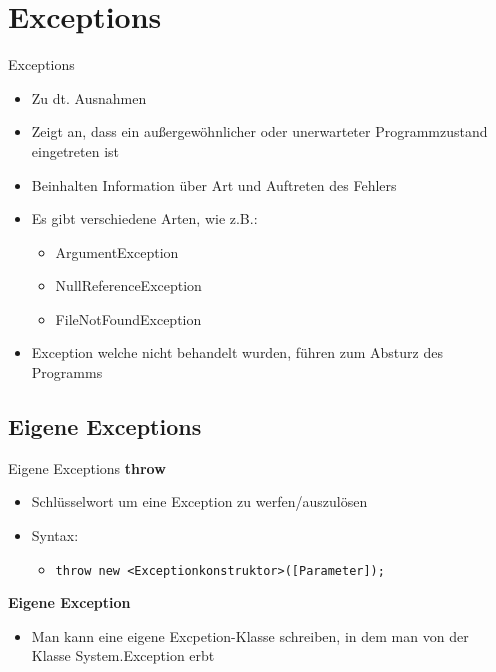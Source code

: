 \section{Exceptions}
\begin{frame}{Exceptions}
	\begin{itemize}
		\item Zu dt. Ausnahmen
		\item Zeigt an, dass ein außergewöhnlicher oder unerwarteter Programmzustand eingetreten ist
		\item Beinhalten Information über Art und Auftreten des Fehlers
		\item Es gibt verschiedene Arten, wie z.B.:
		\begin{itemize} 
			\item ArgumentException
			\item NullReferenceException	
			\item FileNotFoundException
		\end{itemize}
		\item Exception welche nicht behandelt wurden, führen zum Absturz des Programms
	\end{itemize}
\end{frame}

\subsection{Eigene Exceptions}
\begin{frame}{Eigene Exceptions}
	\textbf{throw}\\
	\begin{itemize}
		\item Schlüsselwort um eine Exception zu werfen/auszulösen
		\item Syntax:
		\begin{itemize}
			\item \texttt{throw new \alert{<Exceptionkonstruktor>}(\alert{[Parameter]});}
		\end{itemize}
	\end{itemize}
	\textbf{Eigene Exception}\\
	\begin{itemize}
		\item Man kann eine eigene Excpetion-Klasse schreiben, in dem man von der Klasse \alert{System.Exception} erbt
	\end{itemize}
\end{frame}


